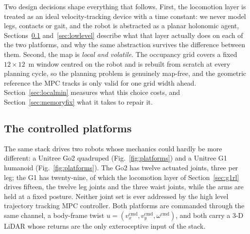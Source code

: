 \documentclass[11pt,a4paper]{article}
\begin{document}
Two design decisions shape everything that follows. First, the locomotion layer is treated as an ideal
velocity-tracking device with a time constant: we never model legs, contacts or gait, and the robot
is abstracted as a planar holonomic agent, Sections~\ref{sec:platforms} and~\ref{sec:lowlevel} describe
what that layer actually does on each of the two platforms, and why the same abstraction survives the
difference between them. Second, the map is \emph{local and volatile}. The
occupancy grid covers a fixed $12\times12$~m window centred on the robot and is rebuilt from scratch at every
planning cycle, so the planning problem is genuinely map-free, and the geometric reference the MPC tracks is
only valid for one grid width ahead. Section~\ref{sec:localmin} measures what this choice costs, and
Section~\ref{sec:memoryfix} what it takes to repair it.

\subsection{The controlled platforms}
\label{sec:platforms}

The same stack drives two robots whose mechanics could hardly be more different: a Unitree Go2 quadruped
(Fig.~\ref{fig:platforms}) and a Unitree G1 humanoid
(Fig.~\ref{fig:platforms}). The Go2 has
twelve actuated joints, three per leg; the G1 has twenty-nine, of which the locomotion layer of
Section~\ref{sec:g1rl} drives fifteen, the twelve leg joints and the three waist joints, while the arms
are held at a fixed posture. Neither joint set is ever addressed by the high level trajectory tracking MPC controller. Both
platforms are commanded through the same channel, a body-frame twist
$u=(v_x^{\mathrm{cmd}},v_y^{\mathrm{cmd}},\omega^{\mathrm{cmd}})$, and both carry a 3-D LiDAR whose returns
are the only exteroceptive input of the stack.
\end{document}
